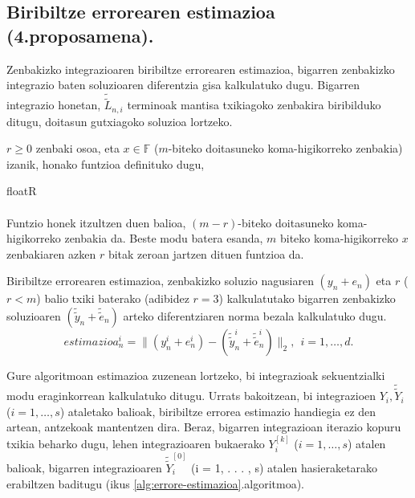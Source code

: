 \subsection{Biribiltze errorearen estimazioa (4.proposamena).}

Zenbakizko integrazioaren biribiltze errorearen estimazioa, bigarren zenbakizko integrazio baten soluzioaren diferentzia gisa kalkulatuko dugu. Bigarren integrazio honetan, $\tilde{\tilde{L}}_{n,i}$ terminoak mantisa txikiagoko zenbakira biribilduko ditugu,  doitasun gutxiagoko soluzioa lortzeko. 

$r\ge0$ zenbaki osoa, eta $x \in \mathbb{F}$ ($m$-biteko doitasuneko koma-higikorreko zenbakia) izanik, honako funtzioa definituko dugu,

\begin{algorithm}[H]
  \SetAlgoLined\DontPrintSemicolon
  \caption{floatR}
\end{algorithm} 

\paragraph*{}Funtzio honek itzultzen duen balioa, $(m-r)$-biteko doitasuneko koma-higikorreko zenbakia da. Beste modu batera esanda, $m$ biteko koma-higikorreko $x$ zenbakiaren azken $r$ bitak zeroan jartzen dituen funtzioa da.

Biribiltze errorearen estimazioa, zenbakizko soluzio nagusiaren $(y_n+e_{n})$ eta $r$ ($r<m$) balio txiki baterako (adibidez $r=3$) kalkulatutako bigarren zenbakizko soluzioaren $(\tilde{\tilde{y}}_n+\tilde{\tilde{e}}_{n})$ arteko diferentziaren norma bezala kalkulatuko dugu. 
\begin{equation}
estimazioa_n^i=\|(y_n^i+e_n^i)-(\tilde{\tilde{y}}_n^i+\tilde{\tilde{e}}_{n}^i)\|_2, \ \ i=1,\dots,d.
\end{equation}

Gure algoritmoan estimazioa zuzenean lortzeko, bi integrazioak sekuentzialki modu eraginkorrean kalkulatuko ditugu. Urrats bakoitzean, bi integrazioen $Y_i,\tilde{\tilde{Y}}_i$ ($i=1,\dots,s$) ataletako balioak, biribiltze errorea estimazio handiegia ez den artean,  antzekoak mantentzen dira. Beraz, bigarren integrazioan iterazio kopuru txikia beharko dugu, lehen integrazioaren bukaerako $Y_i^{[k]}$ ($i=1,\dots,s$) atalen balioak, bigarren integrazioaren $\tilde{\tilde{Y}}_i^{[0]}$ (i = 1, . . . , s) atalen hasieraketarako erabiltzen baditugu (ikus \ref{alg:errore-estimazioa}.algoritmoa).  

